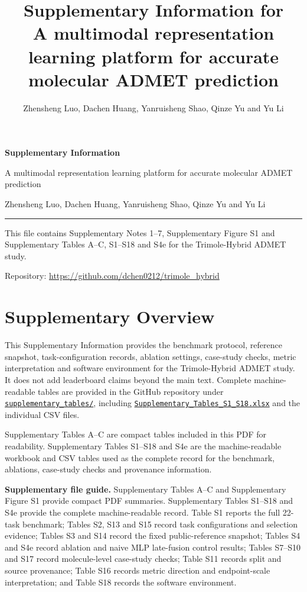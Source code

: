 \documentclass[10pt]{article}
\title{Supplementary Information for\\A multimodal representation learning platform for accurate molecular ADMET prediction}
\author{Zhensheng Luo, Dachen Huang, Yanruisheng Shao, Qinze Yu and Yu Li}
\date{}
\newcommand{\suppnoteplain}[1]{\section*{#1}\addcontentsline{toc}{section}{#1}}
\begin{document}
\begin{titlepage}
\thispagestyle{empty}
\raggedright
\vspace*{1.0cm}
{\Large\bfseries Supplementary Information\par}
\vspace{0.8cm}
{\LARGE\bfseries\begin{minipage}{0.88\textwidth}
\raggedright A multimodal representation learning platform for accurate molecular ADMET prediction
\end{minipage}\par}
\vspace{0.7cm}
{\large Zhensheng Luo, Dachen Huang, Yanruisheng Shao, Qinze Yu and Yu Li\par}
\vspace{1.0cm}
\noindent\rule{\textwidth}{0.6pt}
\vspace{0.35cm}

\begin{minipage}{0.92\textwidth}
This file contains Supplementary Notes 1--7, Supplementary Figure S1 and Supplementary Tables A--C, S1--S18 and S4e for the Trimole-Hybrid ADMET study.
\end{minipage}

\vfill
Repository: \url{https://github.com/dchen0212/trimole_hybrid}
\end{titlepage}
\setcounter{page}{1}
\tableofcontents
\clearpage

\suppnoteplain{Supplementary Overview}

This Supplementary Information provides the benchmark protocol, reference snapshot, task-configuration records, ablation settings, case-study checks, metric interpretation and software environment for the Trimole-Hybrid ADMET study. It does not add leaderboard claims beyond the main text. Complete machine-readable tables are provided in the GitHub repository under \href{https://github.com/dchen0212/trimole_hybrid/tree/main/supplementary_tables}{\texttt{supplementary\_tables/}}, including \href{https://github.com/dchen0212/trimole_hybrid/blob/main/supplementary_tables/Supplementary_Tables_S1_S18.xlsx}{\texttt{Supplementary\_Tables\_S1\_S18.xlsx}} and the individual CSV files.

Supplementary Tables A--C are compact tables included in this PDF for readability. Supplementary Tables S1--S18 and S4e are the machine-readable workbook and CSV tables used as the complete record for the benchmark, ablations, case-study checks and provenance information.

\textbf{Supplementary file guide.}
Supplementary Tables A--C and Supplementary Figure S1 provide compact PDF summaries. Supplementary Tables S1--S18 and S4e provide the complete machine-readable record. Table S1 reports the full 22-task benchmark; Tables S2, S13 and S15 record task configurations and selection evidence; Tables S3 and S14 record the fixed public-reference snapshot; Tables S4 and S4e record ablation and naive MLP late-fusion control results; Tables S7--S10 and S17 record molecule-level case-study checks; Table S11 records split and source provenance; Table S16 records metric direction and endpoint-scale interpretation; and Table S18 records the software environment.
\end{document}
